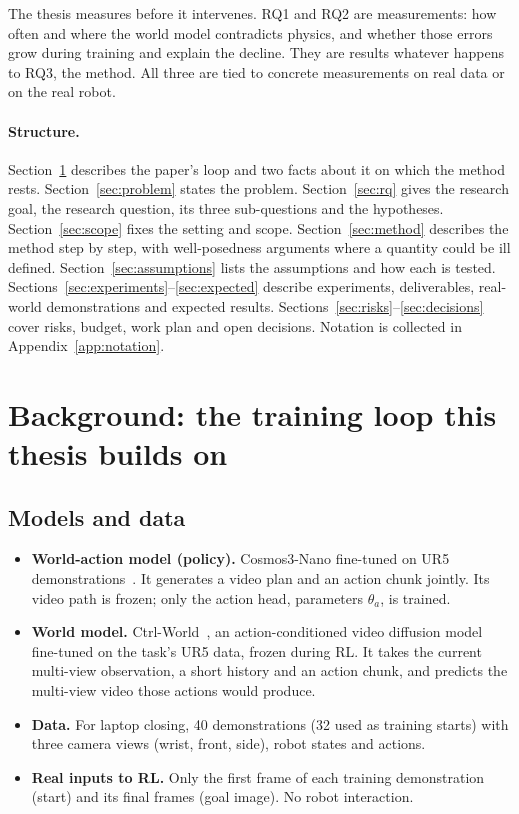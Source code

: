\documentclass[11pt,a4paper]{article}
\theoremstyle{plain}
\theoremstyle{definition}
\theoremstyle{remark}
\begin{document}
The thesis measures before it intervenes. RQ1 and RQ2 are measurements: how often and where the world model contradicts physics, and whether those errors grow during training and explain the decline. They are results whatever happens to RQ3, the method. All three are tied to concrete measurements on real data or on the real robot.

\paragraph{Structure.} Section~\ref{sec:background} describes the paper's loop and two facts about it on which the method rests. Section~\ref{sec:problem} states the problem. Section~\ref{sec:rq} gives the research goal, the research question, its three sub-questions and the hypotheses. Section~\ref{sec:scope} fixes the setting and scope. Section~\ref{sec:method} describes the method step by step, with well-posedness arguments where a quantity could be ill defined. Section~\ref{sec:assumptions} lists the assumptions and how each is tested. Sections~\ref{sec:experiments}--\ref{sec:expected} describe experiments, deliverables, real-world demonstrations and expected results. Sections~\ref{sec:risks}--\ref{sec:decisions} cover risks, budget, work plan and open decisions. Notation is collected in Appendix~\ref{app:notation}.

\section{Background: the training loop this thesis builds on}\label{sec:background}

\subsection{Models and data}
\begin{itemize}
\item \textbf{World-action model (policy).} Cosmos3-Nano fine-tuned on UR5 demonstrations~\cite{cosmos3,a2a}. It generates a video plan and an action chunk jointly. Its video path is frozen; only the action head, parameters $\theta_a$, is trained.
\item \textbf{World model.} Ctrl-World~\cite{ctrlworld}, an action-conditioned video diffusion model fine-tuned on the task's UR5 data, frozen during RL. It takes the current multi-view observation, a short history and an action chunk, and predicts the multi-view video those actions would produce.
\item \textbf{Data.} For laptop closing, 40 demonstrations (32 used as training starts) with three camera views (wrist, front, side), robot states and actions.
\item \textbf{Real inputs to RL.} Only the first frame of each training demonstration (start) and its final frames (goal image). No robot interaction.
\end{itemize}
\end{document}
